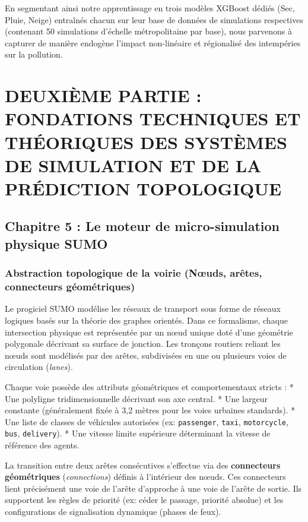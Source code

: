 \documentclass[10pt, a4paper]{article}
\begin{document}
En segmentant ainsi notre apprentissage en trois modèles XGBoost dédiés
(Sec, Pluie, Neige) entraînés chacun sur leur base de données de
simulations respectives (contenant 50 simulations d'échelle
métropolitaine par base), nous parvenons à capturer de manière endogène
l'impact non-linéaire et régionalisé des intempéries sur la pollution.

\newpage

\section{DEUXIÈME PARTIE : FONDATIONS TECHNIQUES ET THÉORIQUES DES
SYSTÈMES DE SIMULATION ET DE LA PRÉDICTION
TOPOLOGIQUE}\label{deuxiuxe8me-partie-fondations-techniques-et-thuxe9oriques-des-systuxe8mes-de-simulation-et-de-la-pruxe9diction-topologique}

\subsection{Chapitre 5 : Le moteur de micro-simulation physique
SUMO}\label{chapitre-5-le-moteur-de-micro-simulation-physique-sumo}

\subsubsection{Abstraction topologique de la voirie (Nœuds, arêtes,
connecteurs
géométriques)}\label{abstraction-topologique-de-la-voirie-nux153uds-aruxeates-connecteurs-guxe9omuxe9triques}

Le progiciel SUMO modélise les réseaux de transport sous forme de
réseaux logiques basés sur la théorie des graphes orientés. Dans ce
formalisme, chaque intersection physique est représentée par un nœud
unique doté d'une géométrie polygonale décrivant sa surface de jonction.
Les tronçons routiers reliant les nœuds sont modélisés par des arêtes,
subdivisées en une ou plusieurs voies de circulation (\emph{lanes}).

Chaque voie possède des attributs géométriques et comportementaux
stricts : * Une polyligne tridimensionnelle décrivant son axe central. *
Une largeur constante (généralement fixée à 3,2 mètres pour les voies
urbaines standards). * Une liste de classes de véhicules autorisées (ex:
\texttt{passenger}, \texttt{taxi}, \texttt{motorcycle}, \texttt{bus},
\texttt{delivery}). * Une vitesse limite supérieure déterminant la
vitesse de référence des agents.

La transition entre deux arêtes consécutives s'effectue via des
\textbf{connecteurs géométriques} (\emph{connections}) définis à
l'intérieur des nœuds. Ces connecteurs lient précisément une voie de
l'arête d'approche à une voie de l'arête de sortie. Ils supportent les
règles de priorité (ex: céder le passage, priorité absolue) et les
configurations de signalisation dynamique (phases de feux).
\end{document}
